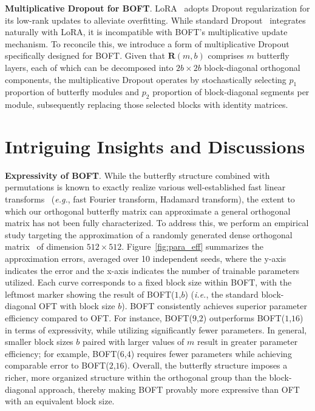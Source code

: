\textbf{Multiplicative Dropout for BOFT}. LoRA~\cite{hulora2022} adopts Dropout regularization for its low-rank updates to alleviate overfitting. While standard Dropout~\cite{srivastava2014dropout} integrates naturally with LoRA, it is incompatible with BOFT’s multiplicative update mechanism. To reconcile this, we introduce a form of multiplicative Dropout specifically designed for BOFT. Given that $\bm{R}(m,b)$ comprises $m$ butterfly layers, each of which can be decomposed into $2b\times 2b$ block-diagonal orthogonal components, the multiplicative Dropout operates by stochastically selecting $p_1$ proportion of butterfly modules and $p_2$ proportion of block-diagonal segments per module, subsequently replacing those selected blocks with identity matrices.

\section{Intriguing Insights and Discussions}

\textbf{Expressivity of BOFT}. While the butterfly structure combined with permutations is known to exactly realize various well-established fast linear transforms~\cite{dao2019learning,dao2019kaleidoscope} (\emph{e.g.}, fast Fourier transform, Hadamard transform), the extent to which our orthogonal butterfly matrix can approximate a general orthogonal matrix has not been fully characterized. To address this, we perform an empirical study targeting the approximation of a randomly generated dense orthogonal matrix~\cite{anderson1987generation} of dimension $512\times 512$. Figure~\ref{fig:para_eff} summarizes the approximation errors, averaged over 10 independent seeds, where the y-axis indicates the error and the x-axis indicates the number of trainable parameters utilized. Each curve corresponds to a fixed block size within BOFT, with the leftmost marker showing the result of BOFT($1$,$b$) (\emph{i.e.}, the standard block-diagonal OFT with block size $b$). BOFT consistently achieves superior parameter efficiency compared to OFT. For instance, BOFT($9$,$2$) outperforms BOFT($1$,$16$) in terms of expressivity, while utilizing significantly fewer parameters. In general, smaller block sizes $b$ paired with larger values of $m$ result in greater parameter efficiency; for example, BOFT($6$,$4$) requires fewer parameters while achieving comparable error to BOFT($2$,$16$). Overall, the butterfly structure imposes a richer, more organized structure within the orthogonal group than the block-diagonal approach, thereby making BOFT provably more expressive than OFT with an equivalent block size.

